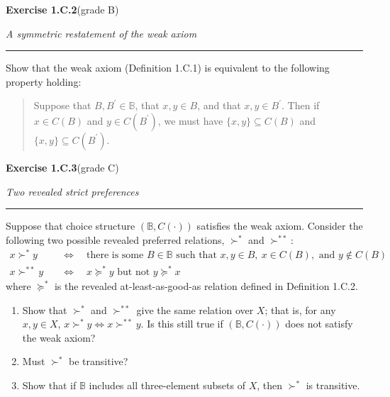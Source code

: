 \documentclass[12pt]{article}
\newcommand{\exercise}[3]{%
  \par\penalty-250\bigskip
  \noindent\textbf{\large Exercise #1}\quad\textnormal{(grade #2)}%
  \par\nobreak\smallskip
  \noindent\textit{#3}%
  \par\nobreak\smallskip
  \noindent\rule{\linewidth}{0.4pt}%
  \par\nobreak\smallskip}
\newenvironment{statement}{\par\medskip}{\par\medskip}
\begin{document}
\exercise{1.C.2}{B}{A symmetric restatement of the weak axiom}

\begin{statement}
Show that the weak axiom (Definition 1.C.1) is equivalent to the following
property holding:
\begin{quote}
Suppose that $B,B^{\prime}\in\mathbb B$, that $x,y\in B$, and that
$x,y\in B^{\prime}$. Then if $x\in C(B)$ and $y\in C(B^{\prime})$, we must have
$\{x,y\}\subseteq C(B)$ and $\{x,y\}\subseteq C(B^{\prime})$.
\end{quote}
\end{statement}


\exercise{1.C.3}{C}{Two revealed strict preferences}

\begin{statement}
Suppose that choice structure $(\mathbb B,C(\cdot))$ satisfies the weak axiom.
Consider the following two possible revealed preferred relations, $\succ^{*}$
and $\succ^{**}$:
\[
\begin{aligned}
x\succ^{*}y \quad&\Longleftrightarrow\quad
\text{there is some }B\in\mathbb B\text{ such that }x,y\in B,\ x\in C(B),
\text{ and } y\notin C(B)\\
x\succ^{**}y \quad&\Longleftrightarrow\quad
x\succeq^{*}y\text{ but not }y\succeq^{*}x
\end{aligned}
\]
where $\succeq^{*}$ is the revealed at-least-as-good-as relation defined in
Definition 1.C.2.
\begin{enumerate}[label=(\alph*),leftmargin=2.4em,topsep=.3em,itemsep=.25em]
  \item Show that $\succ^{*}$ and $\succ^{**}$ give the same relation over $X$;
        that is, for any $x,y\in X$, $x\succ^{*}y\iff x\succ^{**}y$. Is this
        still true if $(\mathbb B,C(\cdot))$ does not satisfy the weak axiom?
  \item Must $\succ^{*}$ be transitive?
  \item Show that if $\mathbb B$ includes all three-element subsets of $X$,
        then $\succ^{*}$ is transitive.
\end{enumerate}
\end{statement}
\end{document}
